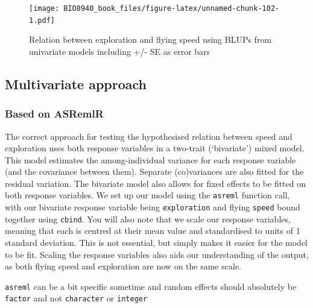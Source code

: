 \documentclass[
  12pt,
]{book}
\begin{document}
\begin{figure}
\centering
\texttt{[image: BIO8940\_book\_files/figure-latex/unnamed-chunk-102-1.pdf]}
\caption{\label{fig:unnamed-chunk-102}Relation between exploration and flying speed using BLUPs from univariate models including +/- SE as error bars}
\end{figure}

\hypertarget{multivariate-approach}{%
\subsection{Multivariate approach}\label{multivariate-approach}}

\hypertarget{based-on-asremlr}{%
\subsubsection{Based on ASRemlR}\label{based-on-asremlr}}

The correct approach for testing the hypothesised relation between speed and exploration uses both response variables in a two-trait (`bivariate') mixed model. This model estimates the among-individual variance for each response variable (and the covariance between them).
Separate (co)variances are also fitted for the residual variation.
The bivariate model also allows for fixed effects to be fitted on both response variables.
We set up our model using the \texttt{asreml} function call, with our bivariate response variable being \texttt{exploration} and flying \texttt{speed} bound together using \texttt{cbind}. You will also note that we scale our response variables, meaning that each is centred at their mean value and standardised to units of 1 standard deviation. This is not essential, but simply makes it easier for the model to be fit. Scaling the response variables also aids our understanding of the output, as both flying speed and exploration are now on the same scale.

\texttt{asreml} can be a bit specific sometime and random effects should absolutely be \texttt{factor} and not \texttt{character} or \texttt{integer}
\end{document}
